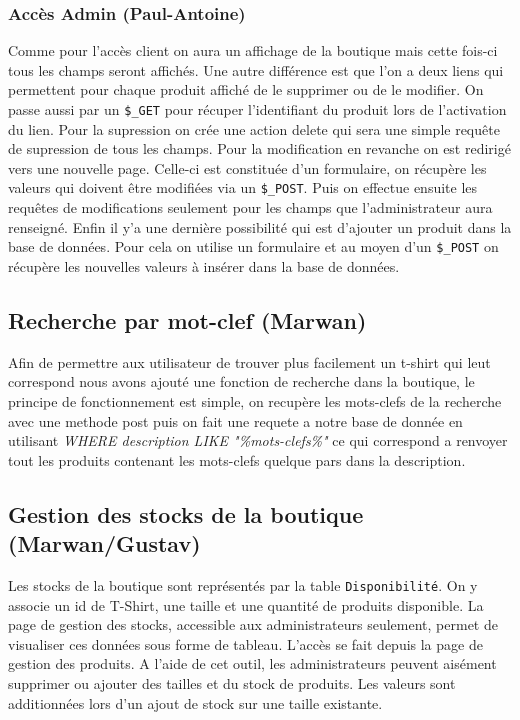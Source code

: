 \documentclass[french]{article}
\begin{document}
\subsubsection{Accès Admin (Paul-Antoine)}
Comme pour l'accès client on aura un affichage de la boutique mais cette fois-ci tous les champs seront affichés. Une autre différence est que l'on a deux liens qui permettent pour chaque produit affiché de le supprimer ou de le modifier. On passe aussi par un \verb|$_GET| pour récuper l'identifiant du produit lors de l'activation du lien. Pour la supression on crée une action delete qui sera une simple requête de supression de tous les champs. Pour la modification en revanche on est redirigé vers une nouvelle page. Celle-ci est constituée d'un formulaire, on récupère les valeurs qui doivent être modifiées via un \verb|$_POST|. Puis on effectue ensuite les requêtes de modifications seulement pour les champs que l'administrateur aura renseigné. Enfin il y'a une dernière possibilité qui est d'ajouter un produit dans la base de données. Pour cela on utilise un formulaire et au moyen d'un \verb|$_POST| on récupère les nouvelles valeurs à insérer dans la base de données.

\subsection{Recherche par mot-clef (Marwan)}
Afin de permettre aux utilisateur de trouver plus facilement un t-shirt qui leut correspond nous avons ajouté une fonction de recherche dans la boutique, le principe de fonctionnement est simple, on recupère les mots-clefs de la recherche avec une methode post puis on fait une requete a notre base de donnée en utilisant \textit{WHERE description LIKE "\%mots-clefs\%"} ce qui correspond a renvoyer tout les produits contenant les mots-clefs quelque pars dans la description.

\subsection{Gestion des stocks de la boutique (Marwan/Gustav)}
Les stocks de la boutique sont représentés par la table \verb|Disponibilité|. On y associe un id de T-Shirt, une taille et une quantité de produits disponible. La page de gestion des stocks, accessible aux administrateurs seulement, permet de visualiser ces donn\'{e}es sous forme de tableau. L'acc\`{e}s se fait depuis la page de gestion des produits. A l'aide de cet outil, les administrateurs peuvent ais\'{e}ment supprimer ou ajouter des tailles et du stock de produits. Les valeurs sont additionnées lors d'un ajout de stock sur une taille existante.
\end{document}
